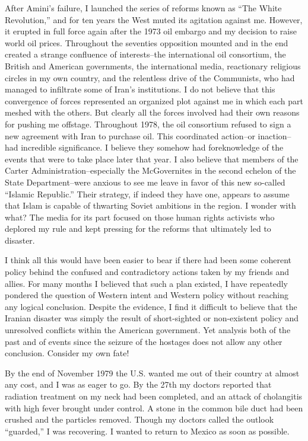 After Amini's failure, I launched the series of reforms known as “The White Revolution,” and for ten years the West muted its agitation against me. However, it erupted in full force again after the 1973 oil embargo and my decision to raise world oil prices. Throughout the seventies opposition mounted and in the end created a strange confluence of interests--the international oil consortium, the British and American governments, the international media, reactionary religious circles in my own country, and the relentless drive of the Communists, who had managed to infiltrate some of Iran's institutions. I do not believe that this convergence of forces represented an organized plot against me in which each part meshed with the others. But clearly all the forces involved had their own reasons for pushing me offstage. Throughout 1978, the oil consortium refused to sign a new agreement with Iran to purchase oil. This coordinated action--or inaction--had incredible significance. I believe they somehow had foreknowledge of the events that were to take place later that year. I also believe that members of the Carter Administration--especially the McGovernites in the second echelon of the State Department--were anxious to see me leave in favor of this new so-called “Islamic Republic.” Their strategy, if indeed they have one, appears to assume that Islam is capable of thwarting Soviet ambitions in the region. I wonder with what? The media for its part focused on those human rights activists who deplored my rule and kept pressing for the reforms that ultimately led to disaster. 

I think all this would have been easier to bear if there had been some coherent policy behind the confused and contradictory actions taken by my friends and allies. For many months I believed that such a plan existed, I have repeatedly pondered the question of Western intent and Western policy without reaching any logical conclusion. Despite the evidence, I find it difficult to believe that the Iranian disaster was simply the result of short-sighted or non-existent policy and unresolved conflicts within the American government. Yet analysis both of the past and of events since the seizure of the hostages does not allow any other conclusion. Consider my own fate! 

By the end of November 1979 the U.S. wanted me out of their country at almost any cost, and I was as eager to go. By the 27th my doctors reported that radiation treatment on my neck had been completed, and an attack of cholangitis with high fever brought under control. A stone in the common bile duct had been crushed and the particles removed. Though my doctors called the outlook “guarded,” I was recovering. I wanted to return to Mexico as soon as possible. 

